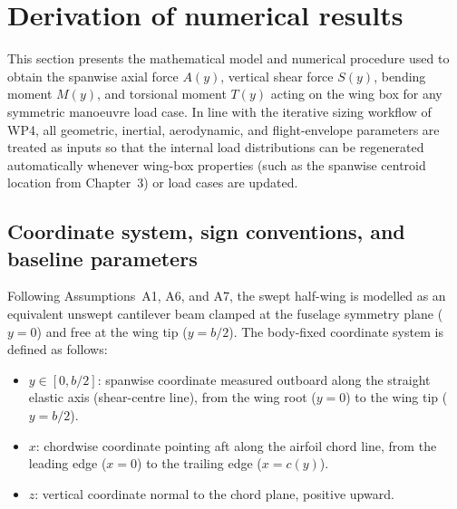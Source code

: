 \section{Derivation of numerical results}
\label{sec:derivation_numerical_results}

This section presents the mathematical model and numerical procedure used to obtain the spanwise axial force $A(y)$, vertical shear force $S(y)$, bending moment $M(y)$, and torsional moment $T(y)$ acting on the wing box for any symmetric manoeuvre load case. In line with the iterative sizing workflow of WP4, all geometric, inertial, aerodynamic, and flight-envelope parameters are treated as inputs so that the internal load distributions can be regenerated automatically whenever wing-box properties (such as the spanwise centroid location from Chapter~3) or load cases are updated.

\subsection{Coordinate system, sign conventions, and baseline parameters}
\label{subsec:coord_and_params}

Following Assumptions~A1, A6, and A7, the swept half-wing is modelled as an equivalent unswept cantilever beam clamped at the fuselage symmetry plane ($y = 0$) and free at the wing tip ($y = b/2$). The body-fixed coordinate system is defined as follows:
\begin{itemize}
    \item $y \in [0, b/2]$: spanwise coordinate measured outboard along the straight elastic axis (shear-centre line), from the wing root ($y = 0$) to the wing tip ($y = b/2$).
    \item $x$: chordwise coordinate pointing aft along the airfoil chord line, from the leading edge ($x = 0$) to the trailing edge ($x = c(y)$).
    \item $z$: vertical coordinate normal to the chord plane, positive upward.
\end{itemize}

